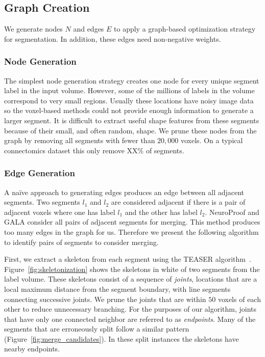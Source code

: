 \subsection{Graph Creation}

We generate nodes $N$ and edges $E$ to apply a graph-based optimization strategy for segmentation. 
In addition, these edges need non-negative weights.

\subsubsection{Node Generation}

The simplest node generation strategy creates one node for every unique segment label in the input volume.
However, some of the millions of labels in the volume correspond to very small regions. 
Usually these locations have noisy image data so the voxel-based methods could not provide enough information to generate a larger segment.
It is difficult to extract useful shape features from these segments because of their small, and often random, shape. 
We prune these nodes from the graph by removing all segments with fewer than $20,000$ voxels. 
On a typical connectomics dataset this only remove XX$\%$ of segments. 

\subsubsection{Edge Generation}



A na\"ive approach to generating edges produces an edge between all adjacent segments.
Two segments $l_1$ and $l_2$ are considered adjacent if there is a pair of adjacent voxels where one has label $l_1$ and the other has label $l_2$. 
NeuroProof and GALA consider all pairs of adjacent segments for merging. 
This method produces too many edges in the graph for us.
Therefore we present the following algorithm to identify pairs of segments to consider merging. 

First, we extract a skeleton from each segment using the TEASER algorithm~\cite{sato2000teasar,zhao2014automatic}.
Figure~\ref{fig:skeletonization} shows the skeletons in white of two segments from the label volume.
These skeletons consist of a sequence of \textit{joints}, locations that are a local maximum distance from the segment boundary, with line segments connecting successive joints. 
We prune the joints that are within $50$ voxels of each other to reduce unnecessary branching.
For the purposes of our algorithm, joints that have only one connected neighbor are referred to as \textit{endpoints}. 
Many of the segments that are erroneously split follow a similar pattern (Figure~\ref{fig:merge_candidates}). 
In these split instances the skeletons have nearby endpoints.

